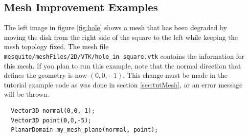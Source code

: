 \subsection{Mesh Improvement Examples}

The left image in figure \ref{fig:hole} shows a mesh that has
been degraded by moving the disk from the right side of the square to
the left while keeping the mesh topology fixed.
The mesh file
\texttt{mesquite/meshFiles/2D/VTK/hole\_in\_square.vtk} contains the
information for this mesh.  If you plan to run this example, note that
the normal direction that defines the geometry is now $(0,0,-1)$.
This change must be made in the tutorial example code
as was done in section \ref{sec:tutMesh}, or an error message will be
thrown.
\begin{verbatim}
  Vector3D normal(0,0,-1);
  Vector3D point(0,0,-5);
  PlanarDomain my_mesh_plane(normal, point);
\end{verbatim}

